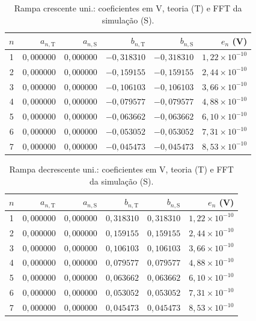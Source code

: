 \begin{table}[H]
\centering
\footnotesize\setlength{\tabcolsep}{2pt}
\caption{Rampa crescente uni.: coeficientes em V, teoria (T) e FFT da simulação (S).}\label{tab:coef_comp1}
\begin{tabular}{crrrrr}\hline
$n$ & $a_{n,\mathrm T}$ & $a_{n,\mathrm S}$ & $b_{n,\mathrm T}$ & $b_{n,\mathrm S}$ & $e_n$ (V) \\ \hline
1 & $0{,}000000$ & $0{,}000000$ & $-0{,}318310$ & $-0{,}318310$ & $1{,}22\!\times\!10^{-10}$ \\
2 & $0{,}000000$ & $0{,}000000$ & $-0{,}159155$ & $-0{,}159155$ & $2{,}44\!\times\!10^{-10}$ \\
3 & $0{,}000000$ & $0{,}000000$ & $-0{,}106103$ & $-0{,}106103$ & $3{,}66\!\times\!10^{-10}$ \\
4 & $0{,}000000$ & $0{,}000000$ & $-0{,}079577$ & $-0{,}079577$ & $4{,}88\!\times\!10^{-10}$ \\
5 & $0{,}000000$ & $0{,}000000$ & $-0{,}063662$ & $-0{,}063662$ & $6{,}10\!\times\!10^{-10}$ \\
6 & $0{,}000000$ & $0{,}000000$ & $-0{,}053052$ & $-0{,}053052$ & $7{,}31\!\times\!10^{-10}$ \\
7 & $0{,}000000$ & $0{,}000000$ & $-0{,}045473$ & $-0{,}045473$ & $8{,}53\!\times\!10^{-10}$ \\
\hline\end{tabular}
\end{table}
\begin{table}[H]
\centering
\footnotesize\setlength{\tabcolsep}{2pt}
\caption{Rampa decrescente uni.: coeficientes em V, teoria (T) e FFT da simulação (S).}\label{tab:coef_comp2}
\begin{tabular}{crrrrr}\hline
$n$ & $a_{n,\mathrm T}$ & $a_{n,\mathrm S}$ & $b_{n,\mathrm T}$ & $b_{n,\mathrm S}$ & $e_n$ (V) \\ \hline
1 & $0{,}000000$ & $0{,}000000$ & $0{,}318310$ & $0{,}318310$ & $1{,}22\!\times\!10^{-10}$ \\
2 & $0{,}000000$ & $0{,}000000$ & $0{,}159155$ & $0{,}159155$ & $2{,}44\!\times\!10^{-10}$ \\
3 & $0{,}000000$ & $0{,}000000$ & $0{,}106103$ & $0{,}106103$ & $3{,}66\!\times\!10^{-10}$ \\
4 & $0{,}000000$ & $0{,}000000$ & $0{,}079577$ & $0{,}079577$ & $4{,}88\!\times\!10^{-10}$ \\
5 & $0{,}000000$ & $0{,}000000$ & $0{,}063662$ & $0{,}063662$ & $6{,}10\!\times\!10^{-10}$ \\
6 & $0{,}000000$ & $0{,}000000$ & $0{,}053052$ & $0{,}053052$ & $7{,}31\!\times\!10^{-10}$ \\
7 & $0{,}000000$ & $0{,}000000$ & $0{,}045473$ & $0{,}045473$ & $8{,}53\!\times\!10^{-10}$ \\
\hline\end{tabular}
\end{table}
